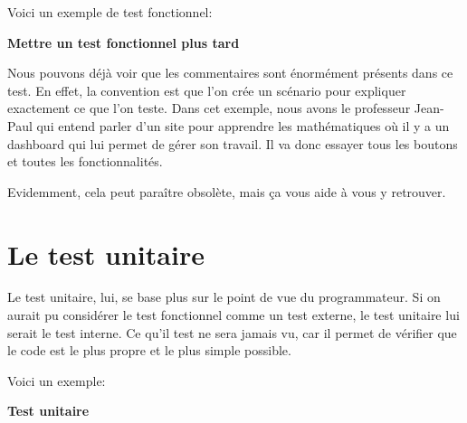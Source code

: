 \documentclass[letterpaper,10pt,french]{sphinxmanual}
\begin{document}
Voici un exemple de test fonctionnel:

\textbf{Mettre un test fonctionnel plus tard}

Nous pouvons déjà voir que les commentaires sont énormément présents dans ce
test. En effet, la convention est que l'on crée un scénario pour expliquer
exactement ce que l'on teste. Dans cet exemple, nous avons le professeur
Jean-Paul qui entend parler d'un site pour apprendre les mathématiques où il y a
un dashboard qui lui permet de gérer son travail. Il va donc essayer
tous les boutons et toutes les fonctionnalités.

Evidemment, cela peut paraître obsolète, mais ça vous aide à vous y retrouver.


\section{Le test unitaire}
\label{tdd:le-test-unitaire}
Le test unitaire, lui, se base plus sur le point de vue du programmateur. Si on
aurait pu considérer le test fonctionnel comme un test externe, le test unitaire
lui serait le test interne. Ce qu'il test ne sera jamais vu, car il permet de
vérifier que le code est le plus propre et le plus simple possible.

Voici un exemple:

\textbf{Test unitaire}
\end{document}
